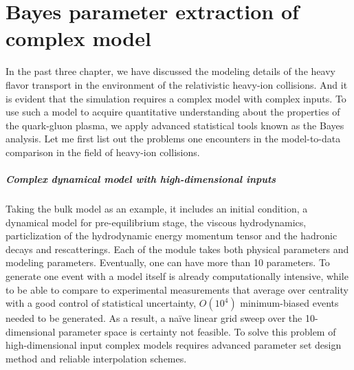 \chapter{Bayes parameter extraction of complex model}
In the past three chapter, we have discussed the modeling details of the heavy flavor transport in the environment of the relativistic heavy-ion collisions.
And it is evident that the simulation requires a complex model with complex inputs.
To use such a model to acquire quantitative understanding about the properties of the quark-gluon plasma, we apply advanced statistical tools known as the Bayes analysis.
Let me first list out the problems one encounters in the model-to-data comparison in the field of heavy-ion collisions.

\paragraph{Complex dynamical model with high-dimensional inputs}
Taking the bulk model as an example, it includes an initial condition, a dynamical model for pre-equilibrium stage, the viscous hydrodynamics, particlization of the hydrodynamic energy momentum tensor and the hadronic decays and rescatterings.
Each of the module takes both physical parameters and modeling parameters.
Eventually, one can have more than 10 parameters.
To generate one event with a model itself is already computationally intensive, while to be able to compare to experimental measurements that average over centrality with a good control of statistical uncertainty, $O(10^4)$ minimum-biased events needed to be generated.
As a result, a na\"ive linear grid sweep over the 10-dimensional parameter space is certainty not feasible.
To solve this problem of high-dimensional input complex models requires advanced parameter set design method and reliable interpolation schemes.

